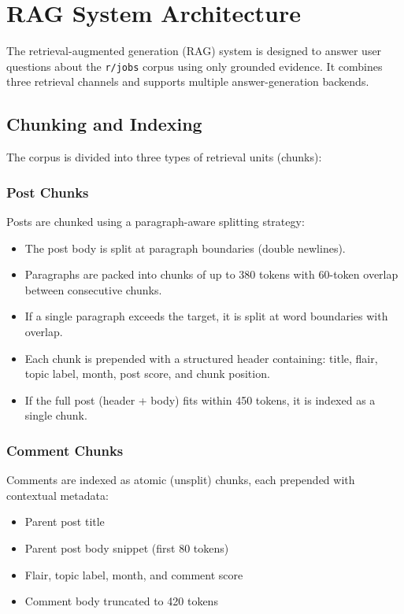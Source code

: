 \documentclass[11pt,a4paper]{article}
\begin{document}
\section{RAG System Architecture}
\label{sec:rag}

The retrieval-augmented generation (RAG) system is designed to answer user questions about the \texttt{r/jobs} corpus using only grounded evidence. It combines three retrieval channels and supports multiple answer-generation backends.

\subsection{Chunking and Indexing}
\label{sec:chunking}

The corpus is divided into three types of retrieval units (chunks):

\subsubsection{Post Chunks}

Posts are chunked using a paragraph-aware splitting strategy:
\begin{itemize}[leftmargin=*]
  \item The post body is split at paragraph boundaries (double newlines).
  \item Paragraphs are packed into chunks of up to 380 tokens with 60-token overlap between consecutive chunks.
  \item If a single paragraph exceeds the target, it is split at word boundaries with overlap.
  \item Each chunk is prepended with a structured header containing: title, flair, topic label, month, post score, and chunk position.
  \item If the full post (header + body) fits within 450 tokens, it is indexed as a single chunk.
\end{itemize}

\subsubsection{Comment Chunks}

Comments are indexed as atomic (unsplit) chunks, each prepended with contextual metadata:
\begin{itemize}[leftmargin=*]
  \item Parent post title
  \item Parent post body snippet (first 80 tokens)
  \item Flair, topic label, month, and comment score
  \item Comment body truncated to 420 tokens
\end{itemize}
\end{document}
